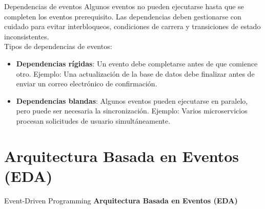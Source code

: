 \documentclass[11pt]{beamer}
\begin{document}
	\begin{frame}{Dependencias de eventos}
	Algunos eventos no pueden ejecutarse hasta que se completen los eventos prerequisito. Las dependencias deben gestionarse con cuidado para evitar interbloqueos, condiciones de carrera y transiciones de estado inconsistentes.\newline
	\\
	Tipos de dependencias de eventos:
	\begin{itemize}
		\item \textbf{Dependencias rígidas}: Un evento debe completarse antes de que comience otro. Ejemplo: Una actualización de la base de datos debe finalizar antes de enviar un correo electrónico de confirmación.
	\item \textbf{Dependencias blandas}: Algunos eventos pueden ejecutarse en paralelo, pero puede ser necesaria la sincronización. Ejemplo: Varios microservicios procesan solicitudes de usuario simultáneamente.	
	\end{itemize}
	\end{frame}
	
	
	\section{Arquitectura Basada en Eventos (EDA)}
	
	\begin{frame}{Event-Driven Programming}
		\huge \centering
		\textbf{Arquitectura Basada en Eventos (EDA)}
	\end{frame}
	
\end{document}

